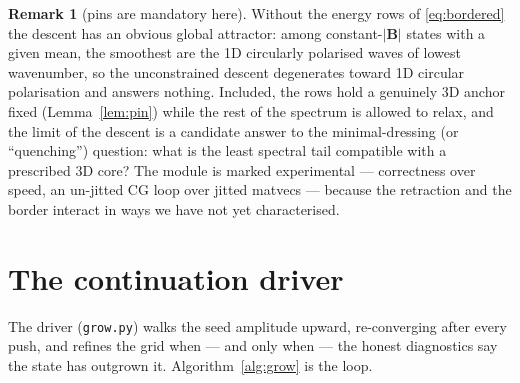 \documentclass[11pt]{article}
\theoremstyle{definition}
\newtheorem{remark}[theorem]{Remark}
\newcommand{\B}{\mathbf{B}}
\begin{document}
\begin{remark}[pins are mandatory here]\label{rem:pins-descent}
Without the energy rows of \eqref{eq:bordered} the descent has an obvious
global attractor: among constant-$|\B|$ states with a given mean, the
smoothest are the 1D circularly polarised waves of lowest wavenumber, so the
unconstrained descent degenerates toward 1D circular polarisation and answers
nothing. Included, the rows hold a genuinely 3D anchor fixed
(Lemma~\ref{lem:pin}) while the rest of the spectrum is allowed to relax, and
the limit of the descent is a candidate answer to the minimal-dressing (or
``quenching'') question: what is the least spectral tail compatible with a
prescribed 3D core? The module is marked experimental --- correctness over
speed, an un-jitted CG loop over jitted matvecs --- because the retraction and
the border interact in ways we have not yet characterised.
\end{remark}

\section{The continuation driver}\label{sec:driver}

The driver (\texttt{grow.py}) walks the seed amplitude upward, re-converging
after every push, and refines the grid when --- and only when --- the honest
diagnostics say the state has outgrown it. Algorithm~\ref{alg:grow} is the
loop.
\end{document}
